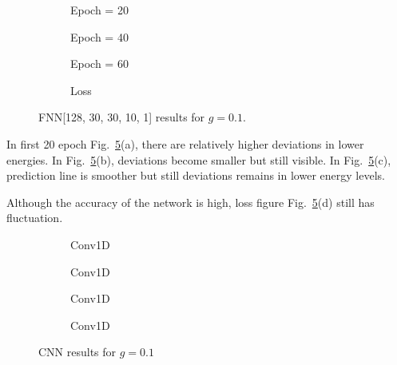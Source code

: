 \documentclass[a4paper,times,12pt]{article}
\begin{document}
\begin{figure}[H]
    \centering
    \begin{subfigure}[t]{0.45\textwidth}
		\centering
        
        \caption{Epoch = 20}
		\label{fig:a}
    \end{subfigure}
    \begin{subfigure}[t]{0.45\textwidth}
		\centering
        
        \caption{Epoch = 40}
		\label{fig:b}
    \end{subfigure}    
    \begin{subfigure}[t]{0.45\textwidth}
        \centering
        
        \caption{Epoch = 60}
		\label{fig:c}
    \end{subfigure}
    \begin{subfigure}[t]{0.45\textwidth}
        \centering
        
        \caption{Loss}
		\label{fig:c}
    \end{subfigure}
	\caption{FNN[128, 30, 30, 10, 1] results for $g = 0.1$.}
\label{fig:FFN-g-0.1}
\end{figure}

In first 20 epoch Fig.~\ref{fig:FFN-g-0.1}(a), there are relatively higher deviations in lower energies. In Fig.~\ref{fig:FFN-g-0.1}(b), deviations become smaller but still visible. In Fig.~\ref{fig:FFN-g-0.1}(c), prediction line is smoother but still deviations remains in lower energy levels.

Although the accuracy of the network is high, loss figure Fig.~\ref{fig:FFN-g-0.1}(d) still has fluctuation.

\begin{figure}[H]
    \centering
    \begin{subfigure}[t]{0.45\textwidth}
		\centering
        
        \caption{Conv1D}
		\label{fig:a}
    \end{subfigure}
    \begin{subfigure}[t]{0.45\textwidth}
		\centering
        
        \caption{Conv1D}
		\label{fig:b}
    \end{subfigure}    
    \begin{subfigure}[t]{0.45\textwidth}
        \centering
        
        \caption{Conv1D}
		\label{fig:c}
    \end{subfigure}
    \begin{subfigure}[t]{0.45\textwidth}
        \centering
        
        \caption{Conv1D}
		\label{fig:c}
    \end{subfigure}
	\caption{CNN results for $g = 0.1$}
\label{fig:CNN-g-0.1}
\end{figure}
\end{document}
